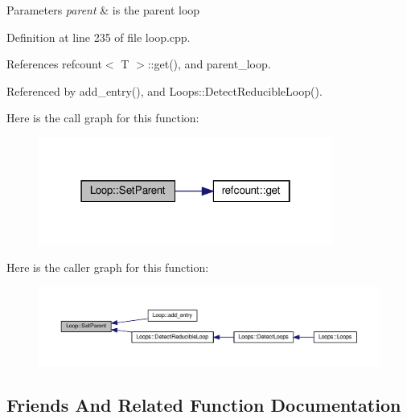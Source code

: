 \begin{DoxyParams}{Parameters}
{\em parent} & is the parent loop \\
\hline
\end{DoxyParams}


Definition at line 235 of file loop.\+cpp.



References refcount$<$ T $>$\+::get(), and parent\+\_\+loop.



Referenced by add\+\_\+entry(), and Loops\+::\+Detect\+Reducible\+Loop().

Here is the call graph for this function\+:
\nopagebreak
\begin{figure}[H]
\begin{center}
\leavevmode
\includegraphics[width=274pt]{de/d77/classLoop_aa25e6e6fd579f595143557de8d61f37e_cgraph}
\end{center}
\end{figure}
Here is the caller graph for this function\+:
\nopagebreak
\begin{figure}[H]
\begin{center}
\leavevmode
\includegraphics[width=350pt]{de/d77/classLoop_aa25e6e6fd579f595143557de8d61f37e_icgraph}
\end{center}
\end{figure}


\subsection{Friends And Related Function Documentation}
\mbox{\label{classLoop_aaa74bc08e8734cd3e20273fb6092781a}} 
